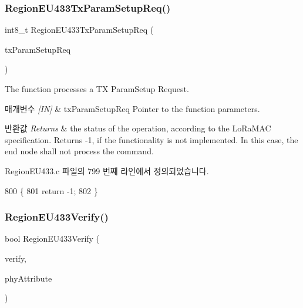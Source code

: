 \subsubsection{\texorpdfstring{Region\+E\+U433\+Tx\+Param\+Setup\+Req()}{RegionEU433TxParamSetupReq()}}
{\footnotesize\ttfamily int8\+\_\+t Region\+E\+U433\+Tx\+Param\+Setup\+Req (\begin{DoxyParamCaption}\item[{\mbox{\hyperlink{group___r_e_g_i_o_n_ga26836ef2996e70410e42ef471073f855}{Tx\+Param\+Setup\+Req\+Params\+\_\+t}} $\ast$}]{tx\+Param\+Setup\+Req }\end{DoxyParamCaption})}



The function processes a TX Param\+Setup Request. 


\begin{DoxyParams}{매개변수}
{\em \mbox{[}\+I\+N\mbox{]}} & tx\+Param\+Setup\+Req Pointer to the function parameters.\\
\hline
\end{DoxyParams}

\begin{DoxyRetVals}{반환값}
{\em Returns} & the status of the operation, according to the Lo\+Ra\+M\+AC specification. Returns -\/1, if the functionality is not implemented. In this case, the end node shall not process the command. \\
\hline
\end{DoxyRetVals}


Region\+E\+U433.\+c 파일의 799 번째 라인에서 정의되었습니다.


\begin{DoxyCode}
800 \{
801     \textcolor{keywordflow}{return} -1;
802 \}
\end{DoxyCode}
\mbox{\label{group___r_e_g_i_o_n_e_u433_ga6ffa44f79bf438495ab15476274e88dd}} 
\subsubsection{\texorpdfstring{Region\+E\+U433\+Verify()}{RegionEU433Verify()}}
{\footnotesize\ttfamily bool Region\+E\+U433\+Verify (\begin{DoxyParamCaption}\item[{\mbox{\hyperlink{group___r_e_g_i_o_n_ga966d97bc2f25df1c09e92e60ef652276}{Verify\+Params\+\_\+t}} $\ast$}]{verify,  }\item[{\mbox{\hyperlink{group___r_e_g_i_o_n_ga9445b07fdf77581ecfaf389970e635f8}{Phy\+Attribute\+\_\+t}}}]{phy\+Attribute }\end{DoxyParamCaption})}



